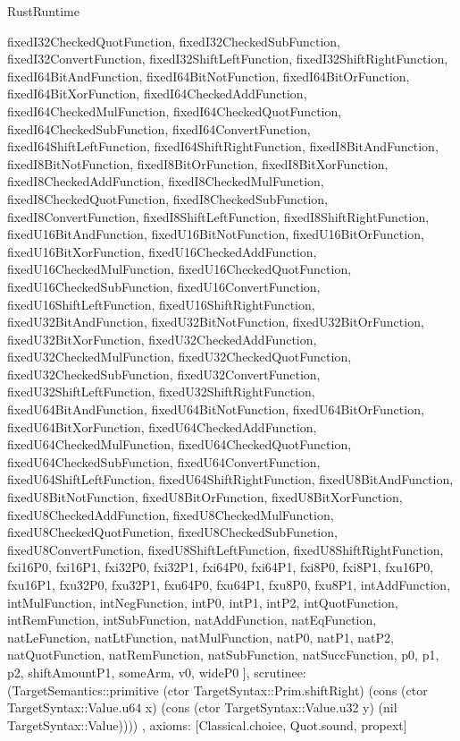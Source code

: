 \begin{lexlean}{RustRuntime}
\begin{semanticmodule}
{{      fixedI32CheckedQuotFunction,
      fixedI32CheckedSubFunction,
      fixedI32ConvertFunction,
      fixedI32ShiftLeftFunction,
      fixedI32ShiftRightFunction,
      fixedI64BitAndFunction,
      fixedI64BitNotFunction,
      fixedI64BitOrFunction,
      fixedI64BitXorFunction,
      fixedI64CheckedAddFunction,
      fixedI64CheckedMulFunction,
      fixedI64CheckedQuotFunction,
      fixedI64CheckedSubFunction,
      fixedI64ConvertFunction,
      fixedI64ShiftLeftFunction,
      fixedI64ShiftRightFunction,
      fixedI8BitAndFunction,
      fixedI8BitNotFunction,
      fixedI8BitOrFunction,
      fixedI8BitXorFunction,
      fixedI8CheckedAddFunction,
      fixedI8CheckedMulFunction,
      fixedI8CheckedQuotFunction,
      fixedI8CheckedSubFunction,
      fixedI8ConvertFunction,
      fixedI8ShiftLeftFunction,
      fixedI8ShiftRightFunction,
      fixedU16BitAndFunction,
      fixedU16BitNotFunction,
      fixedU16BitOrFunction,
      fixedU16BitXorFunction,
      fixedU16CheckedAddFunction,
      fixedU16CheckedMulFunction,
      fixedU16CheckedQuotFunction,
      fixedU16CheckedSubFunction,
      fixedU16ConvertFunction,
      fixedU16ShiftLeftFunction,
      fixedU16ShiftRightFunction,
      fixedU32BitAndFunction,
      fixedU32BitNotFunction,
      fixedU32BitOrFunction,
      fixedU32BitXorFunction,
      fixedU32CheckedAddFunction,
      fixedU32CheckedMulFunction,
      fixedU32CheckedQuotFunction,
      fixedU32CheckedSubFunction,
      fixedU32ConvertFunction,
      fixedU32ShiftLeftFunction,
      fixedU32ShiftRightFunction,
      fixedU64BitAndFunction,
      fixedU64BitNotFunction,
      fixedU64BitOrFunction,
      fixedU64BitXorFunction,
      fixedU64CheckedAddFunction,
      fixedU64CheckedMulFunction,
      fixedU64CheckedQuotFunction,
      fixedU64CheckedSubFunction,
      fixedU64ConvertFunction,
      fixedU64ShiftLeftFunction,
      fixedU64ShiftRightFunction,
      fixedU8BitAndFunction,
      fixedU8BitNotFunction,
      fixedU8BitOrFunction,
      fixedU8BitXorFunction,
      fixedU8CheckedAddFunction,
      fixedU8CheckedMulFunction,
      fixedU8CheckedQuotFunction,
      fixedU8CheckedSubFunction,
      fixedU8ConvertFunction,
      fixedU8ShiftLeftFunction,
      fixedU8ShiftRightFunction,
      fxi16P0,
      fxi16P1,
      fxi32P0,
      fxi32P1,
      fxi64P0,
      fxi64P1,
      fxi8P0,
      fxi8P1,
      fxu16P0,
      fxu16P1,
      fxu32P0,
      fxu32P1,
      fxu64P0,
      fxu64P1,
      fxu8P0,
      fxu8P1,
      intAddFunction,
      intMulFunction,
      intNegFunction,
      intP0,
      intP1,
      intP2,
      intQuotFunction,
      intRemFunction,
      intSubFunction,
      natAddFunction,
      natEqFunction,
      natLeFunction,
      natLtFunction,
      natMulFunction,
      natP0,
      natP1,
      natP2,
      natQuotFunction,
      natRemFunction,
      natSubFunction,
      natSuccFunction,
      p0,
      p1,
      p2,
      shiftAmountP1,
      someArm,
      v0,
      wideP0
    ],
    scrutinee: (TargetSemantics::primitive (ctor TargetSyntax::Prim.shiftRight) (cons (ctor TargetSyntax::Value.u64 x) (cons (ctor TargetSyntax::Value.u32 y) (nil TargetSyntax::Value))))
  },
  axioms: [Classical.choice, Quot.sound, propext]
}


\end{semanticmodule}
\end{lexlean}
